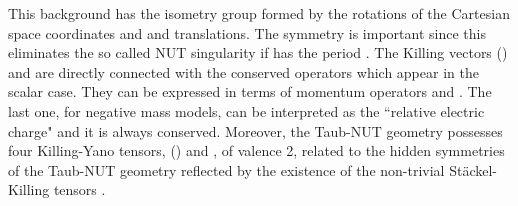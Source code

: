 \documentclass[a4paper,12pt]{article}
\begin{document}
This background has the isometry group  
\coordHE{} formed by the rotations of the 
Cartesian space coordinates and \coordHE{} and \coordHE{} translations. The \coordHE{} 
symmetry is important since this eliminates the so called NUT singularity
if \coordHE{} has the period \myHighlight{$4\pi\mu$}\coordHE{}. The  Killing vectors \coordHE{} 
(\coordHE{}) and \coordHE{}  are directly connected with the conserved 
operators which appear in the scalar case. They can be expressed in terms 
of momentum operators 
\coordHE{} and \coordHE{}
\cite{GRFH}. The last one, for negative mass models, can be interpreted 
as the ``relative electric charge"  and it is always conserved.
Moreover, the Taub-NUT geometry possesses four 
Killing-Yano tensors, \coordHE{} (\coordHE{}) and \coordHE{}, 
of valence 2, related to the hidden symmetries of the Taub-NUT geometry  
reflected by the existence of the non-trivial St\" ackel-Killing tensors 
\coordHE{} \cite{GRFH,VV,CV2,CV1}.
\end{document}
